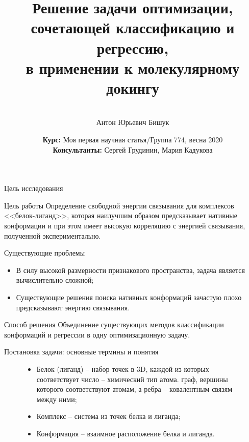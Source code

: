 \documentclass[hyperref={unicode}]{beamer}
\title[\hbox to 56mm{Joint Convex Learning \hfill\insertframenumber\,/\,\inserttotalframenumber}]
{Решение задачи оптимизации, сочетающей классификацию и регрессию,\\ в применении к молекулярному докингу}
\author[А.\,Ю. Бишук]{\large \\Антон Юрьевич Бишук}
\institute{\large
Московский физико-технический институт}
\date{\footnotesize{\textbf{Курс:} Моя первая научная статья/Группа 774, весна 2020\\\textbf{Консультанты:} Сергей Грудинин, Мария Кадукова}}
\begin{document}
\begin{frame}
\titlepage
\end{frame}
\begin{frame}{Цель исследования}
\begin{block}{Цель работы}
\footnotesize 
Определение свободной энергии связывания для комплексов <<белок-лиганд>>, которая наилучшим образом предсказывает нативные конформации и при этом имеет высокую корреляцию с энергией связывания, полученной экспериментально.
\end{block}

\begin{block}{Существующие проблемы}
\footnotesize 
\begin{itemize}
    \item В силу высокой размерности признакового пространства, задача является вычислительно сложной;
    \item Существующие решения поиска нативных конформаций зачастую плохо предсказывают энергию связывания.
\end{itemize}
\end{block}

\begin{block}{Способ решения}
\footnotesize 
Объединение существующих методов классификации конформаций и регрессии в одну оптимизационную задачу.
\end{block}

\end{frame}
\begin{frame}{Постановка задачи: основные термины и понятия}
\begin{figure}[h]
\begin{minipage}[h]{0.49\linewidth}
\end{minipage}
\hfill
\begin{minipage}[h]{0.49\linewidth}
\begin{itemize}
    \item Белок (лиганд) -- набор точек в 3D, каждой из которых соответствует число -- химический тип атома.
    граф, вершины которого соответствуют атомам, а ребра -- ковалентным связям между ними;
    \item Комплекс -- система из точек белка и лиганда;
    \item Конформация -- взаимное расположение белка и лиганда.
\end{itemize}
\end{minipage}
\label{ris:image1}
\end{figure}
\end{frame}
\end{document}
